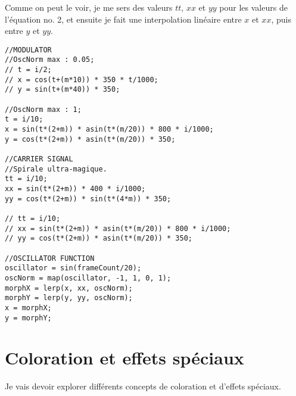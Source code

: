 Comme on peut le voir, je me sers des valeurs $tt$, $xx$ et $yy$ pour les valeurs de l'équation no. 2, et ensuite je fait une interpolation linéaire entre $x$ et $xx$, puis entre $y$ et $yy$.

\begin{lstlisting}
//MODULATOR
//OscNorm max : 0.05;
// t = i/2;
// x = cos(t+(m*10)) * 350 * t/1000;
// y = sin(t+(m*40)) * 350;

//OscNorm max : 1;
t = i/10;
x = sin(t*(2+m)) * asin(t*(m/20)) * 800 * i/1000;
y = cos(t*(2+m)) * asin(t*(m/20)) * 350;

//CARRIER SIGNAL
//Spirale ultra-magique.
tt = i/10;
xx = sin(t*(2+m)) * 400 * i/1000;
yy = cos(t*(2+m)) * sin(t*(4*m)) * 350;

// tt = i/10;
// xx = sin(t*(2+m)) * asin(t*(m/20)) * 800 * i/1000;
// yy = cos(t*(2+m)) * asin(t*(m/20)) * 350;

//OSCILLATOR FUNCTION
oscillator = sin(frameCount/20);
oscNorm = map(oscillator, -1, 1, 0, 1);
morphX = lerp(x, xx, oscNorm);
morphY = lerp(y, yy, oscNorm);
x = morphX;
y = morphY;
\end{lstlisting}

\section{Coloration et effets spéciaux}

Je vais devoir explorer différents concepts de coloration et d'effets spéciaux.